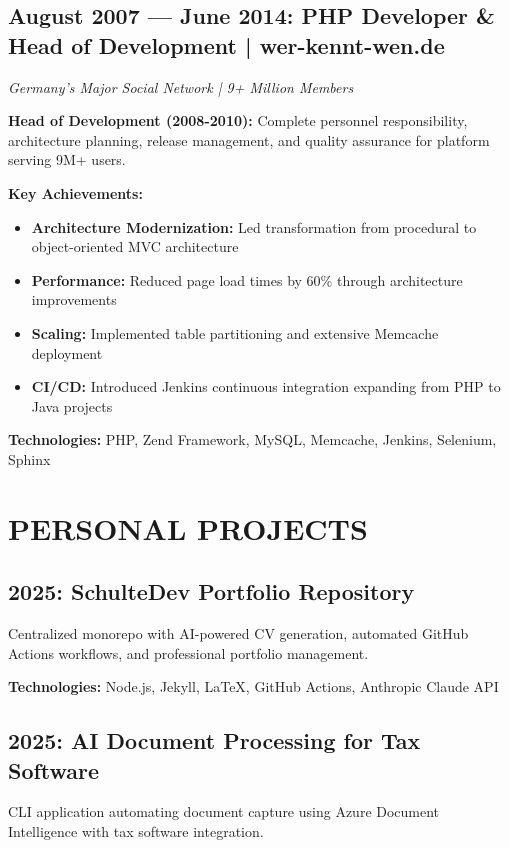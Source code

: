 \documentclass[10pt,a4paper]{article}
\begin{document}
\vspace{4pt}

\subsection{August 2007 — June 2014: PHP Developer \& Head of Development | wer-kennt-wen.de}
\textit{Germany's Major Social Network | 9+ Million Members}

\textbf{Head of Development (2008-2010):} Complete personnel responsibility, architecture planning, release management, and quality assurance for platform serving 9M+ users.

\textbf{Key Achievements:}
\begin{itemize}
    \item \textbf{Architecture Modernization:} Led transformation from procedural to object-oriented MVC architecture
    \item \textbf{Performance:} Reduced page load times by 60\% through architecture improvements
    \item \textbf{Scaling:} Implemented table partitioning and extensive Memcache deployment
    \item \textbf{CI/CD:} Introduced Jenkins continuous integration expanding from PHP to Java projects
\end{itemize}

\textbf{Technologies:} PHP, Zend Framework, MySQL, Memcache, Jenkins, Selenium, Sphinx

\vspace{6pt}

\section{PERSONAL PROJECTS}

\subsection{2025: SchulteDev Portfolio Repository}
Centralized monorepo with AI-powered CV generation, automated GitHub Actions workflows, and professional portfolio management.

\textbf{Technologies:} Node.js, Jekyll, LaTeX, GitHub Actions, Anthropic Claude API

\subsection{2025: AI Document Processing for Tax Software}
CLI application automating document capture using Azure Document Intelligence with tax software integration.
\end{document}
